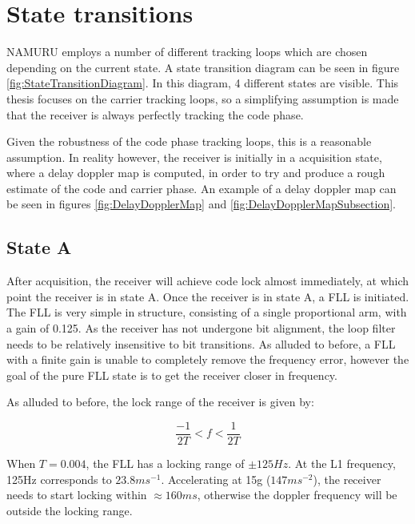 \chapter{State transitions}
\label{ch:StateTransitions}



\ac{NAMURU} employs a number of different tracking loops which are chosen depending on the current state. A state transition diagram can be seen in figure \ref{fig:StateTransitionDiagram}. In this diagram, 4 different states are visible. This thesis focuses on the carrier tracking loops, so a simplifying assumption is made that the receiver is always perfectly tracking the code phase. 

Given the robustness of the code phase tracking loops, this is a reasonable assumption. In reality however, the receiver is initially in a acquisition state, where a delay doppler map is computed, in order to try and produce a rough estimate of the code and carrier phase.  An example of a delay doppler map can be seen in figures \ref{fig:DelayDopplerMap} and \ref{fig:DelayDopplerMapSubsection}.




\section{State A}
After acquisition, the receiver will achieve code lock almost immediately, at which point the receiver is in state A. Once the receiver is in state A, a FLL is initiated. The FLL is very simple in structure, consisting of a single proportional arm, with a gain of 0.125. As the receiver has not undergone bit alignment, the loop filter needs to be relatively insensitive to bit transitions. As alluded to before, a FLL with a finite gain is unable to completely remove the frequency error, however the goal of the pure FLL state is to get the receiver closer in frequency.

As alluded to before, the lock range of the receiver is given by:

\begin{equation}
\frac{-1}{2T} < f < \frac{1}{2T}
\end{equation}

When $T = 0.004$, the FLL has a locking range of $\pm 125Hz$. At the L1 frequency, 125Hz corresponds to $23.8ms^{-1}$. Accelerating at 15g ($147ms^{-2}$), the receiver needs to start locking within $\approx 160ms$, otherwise the doppler frequency will be outside the locking range.

